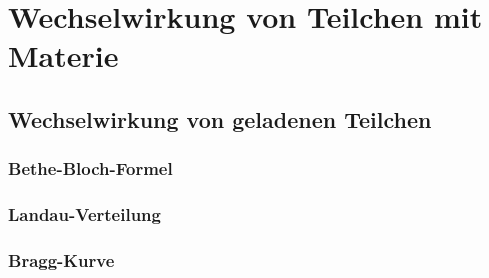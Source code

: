 \documentclass{article}
\begin{document}
\section{Wechselwirkung von Teilchen mit Materie}
\graphicspath{{bilder/1-1/}}
	\subsection{Wechselwirkung von geladenen Teilchen}
		
			\subsubsection{Bethe-Bloch-Formel}
				
			\subsubsection{Landau-Verteilung}
				
			\subsubsection{Bragg-Kurve}
				
\end{document}

